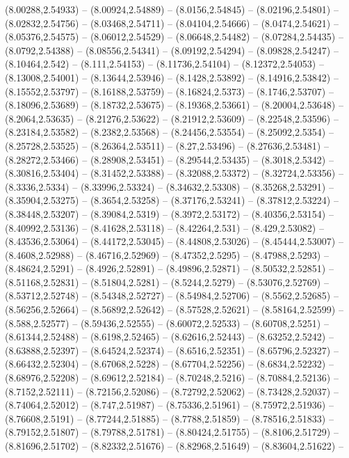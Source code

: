 {(8.00288,2.54933) -- (8.00924,2.54889) -- (8.0156,2.54845) -- (8.02196,2.54801) -- (8.02832,2.54756) -- (8.03468,2.54711) -- (8.04104,2.54666) -- (8.0474,2.54621) -- (8.05376,2.54575) -- (8.06012,2.54529) -- (8.06648,2.54482) -- (8.07284,2.54435) --
(8.0792,2.54388) -- (8.08556,2.54341) -- (8.09192,2.54294) -- (8.09828,2.54247) -- (8.10464,2.542) -- (8.111,2.54153) -- (8.11736,2.54104) -- (8.12372,2.54053) -- (8.13008,2.54001) -- (8.13644,2.53946) -- (8.1428,2.53892) -- (8.14916,2.53842) --
(8.15552,2.53797) -- (8.16188,2.53759) -- (8.16824,2.5373) -- (8.1746,2.53707) -- (8.18096,2.53689) -- (8.18732,2.53675) -- (8.19368,2.53661) -- (8.20004,2.53648) -- (8.2064,2.53635) -- (8.21276,2.53622) -- (8.21912,2.53609) -- (8.22548,2.53596) --
(8.23184,2.53582) -- (8.2382,2.53568) -- (8.24456,2.53554) -- (8.25092,2.5354) -- (8.25728,2.53525) -- (8.26364,2.53511) -- (8.27,2.53496) -- (8.27636,2.53481) -- (8.28272,2.53466) -- (8.28908,2.53451) -- (8.29544,2.53435) -- (8.3018,2.5342) --
(8.30816,2.53404) -- (8.31452,2.53388) -- (8.32088,2.53372) -- (8.32724,2.53356) -- (8.3336,2.5334) -- (8.33996,2.53324) -- (8.34632,2.53308) -- (8.35268,2.53291) -- (8.35904,2.53275) -- (8.3654,2.53258) -- (8.37176,2.53241) -- (8.37812,2.53224) --
(8.38448,2.53207) -- (8.39084,2.5319) -- (8.3972,2.53172) -- (8.40356,2.53154) -- (8.40992,2.53136) -- (8.41628,2.53118) -- (8.42264,2.531) -- (8.429,2.53082) -- (8.43536,2.53064) -- (8.44172,2.53045) -- (8.44808,2.53026) -- (8.45444,2.53007) --
(8.4608,2.52988) -- (8.46716,2.52969) -- (8.47352,2.5295) -- (8.47988,2.5293) -- (8.48624,2.5291) -- (8.4926,2.52891) -- (8.49896,2.52871) -- (8.50532,2.52851) -- (8.51168,2.52831) -- (8.51804,2.5281) -- (8.5244,2.5279) -- (8.53076,2.52769) --
(8.53712,2.52748) -- (8.54348,2.52727) -- (8.54984,2.52706) -- (8.5562,2.52685) -- (8.56256,2.52664) -- (8.56892,2.52642) -- (8.57528,2.52621) -- (8.58164,2.52599) -- (8.588,2.52577) -- (8.59436,2.52555) -- (8.60072,2.52533) -- (8.60708,2.5251) --
(8.61344,2.52488) -- (8.6198,2.52465) -- (8.62616,2.52443) -- (8.63252,2.5242) -- (8.63888,2.52397) -- (8.64524,2.52374) -- (8.6516,2.52351) -- (8.65796,2.52327) -- (8.66432,2.52304) -- (8.67068,2.5228) -- (8.67704,2.52256) -- (8.6834,2.52232) --
(8.68976,2.52208) -- (8.69612,2.52184) -- (8.70248,2.5216) -- (8.70884,2.52136) -- (8.7152,2.52111) -- (8.72156,2.52086) -- (8.72792,2.52062) -- (8.73428,2.52037) -- (8.74064,2.52012) -- (8.747,2.51987) -- (8.75336,2.51961) -- (8.75972,2.51936) --
(8.76608,2.5191) -- (8.77244,2.51885) -- (8.7788,2.51859) -- (8.78516,2.51833) -- (8.79152,2.51807) -- (8.79788,2.51781) -- (8.80424,2.51755) -- (8.8106,2.51729) -- (8.81696,2.51702) -- (8.82332,2.51676) -- (8.82968,2.51649) -- (8.83604,2.51622) --
}
